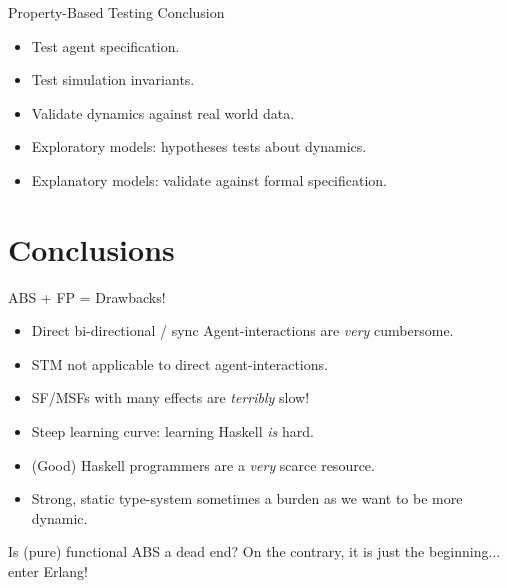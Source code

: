 \documentclass{beamer} %
\begin{document}
\begin{frame}{Property-Based Testing Conclusion}
  \begin{itemize}
    \item Test agent specification.
    \item Test simulation invariants.
    \item Validate dynamics against real world data.
    \item Exploratory models: hypotheses tests about dynamics.
    \item Explanatory models: validate against formal specification.
  \end{itemize}
\end{frame}

\section{Conclusions}

\begin{frame}{ABS + FP = Drawbacks!}
  \begin{itemize}
    \item Direct bi-directional / sync Agent-interactions are \textit{very} cumbersome.
    \item STM not applicable to direct agent-interactions.
    \item SF/MSFs with many effects are \textit{terribly} slow!
    \item Steep learning curve: learning Haskell \textit{is} hard.
    \item (Good) Haskell programmers are a \textit{very} scarce resource.
    \item Strong, static type-system sometimes a burden as we want to be more dynamic.
  \end{itemize}
  
  \begin{block}{Is (pure) functional ABS a dead end?}
    On the contrary, it is just the beginning... enter Erlang!
  \end{block}
\end{frame}
\end{document}
